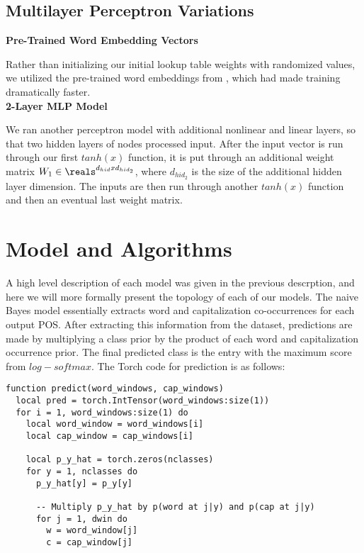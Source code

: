 \documentclass[11pt]{article}
\begin{document}
{{\subsection{Multilayer Perceptron Variations}

\hspace{3ex}\textbf{Pre-Trained Word Embedding Vectors}

Rather than initializing our initial lookup table weights with randomized values, we utilized the pre-trained word embeddings from \cite{pennington2014glove}, which had made training dramatically faster.\\

\textbf{2-Layer MLP Model}

We ran another perceptron model with additional nonlinear and linear layers, so that two hidden layers of nodes processed input. After the input vector is run through our first $tanh(x)$ function, it is put through an additional weight matrix $W_{1} \in \reals^{d_{hid} x d_{hid_2}}$, where $d_{hid_2}$ is the size of the additional hidden layer dimension. The inputs are then run through another $tanh(x)$ function and then an eventual last weight matrix.\\

\section{Model and Algorithms}

A high level description of each model was given in the previous descrption, and here we will more formally present the topology of each of our models. The naive Bayes model essentially extracts word and capitalization co-occurrences for each output POS. After extracting this information from the dataset, predictions are made by multiplying a class prior by the product of each word and capitalization occurrence prior. The final predicted class is the entry with the maximum score from $log-softmax$. The Torch code for prediction is as follows:
\begin{verbatim}
function predict(word_windows, cap_windows)
  local pred = torch.IntTensor(word_windows:size(1))
  for i = 1, word_windows:size(1) do
    local word_window = word_windows[i]
    local cap_window = cap_windows[i]

    local p_y_hat = torch.zeros(nclasses)
    for y = 1, nclasses do
      p_y_hat[y] = p_y[y]

      -- Multiply p_y_hat by p(word at j|y) and p(cap at j|y)
      for j = 1, dwin do
        w = word_window[j]
        c = cap_window[j]


\end{verbatim}}}
\end{document}
